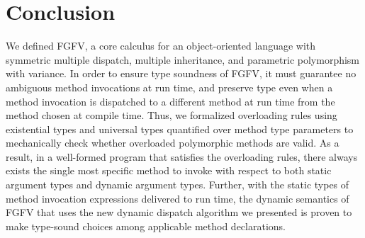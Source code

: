 \section{Conclusion}\label{sec:conc}
We defined FGFV, a core calculus for an object-oriented language
with symmetric multiple dispatch, multiple inheritance, and
parametric polymorphism with variance.
In order to ensure type soundness of FGFV, it must guarantee no ambiguous
method invocations at run time, and preserve type even when a method
invocation is dispatched to a different method at run time from the method
chosen at compile time.
Thus, we formalized overloading rules using existential types and
universal types quantified over method type parameters to mechanically
check whether overloaded polymorphic methods are valid.
As a result, in a well-formed program that satisfies the overloading rules,
there always exists the single most specific method to invoke
with respect to both static argument types and dynamic argument types.
Further, with the static types of method invocation expressions
delivered to run time, the dynamic semantics of FGFV that uses the new
dynamic dispatch algorithm we presented is proven to make
type-sound choices among applicable method declarations.
